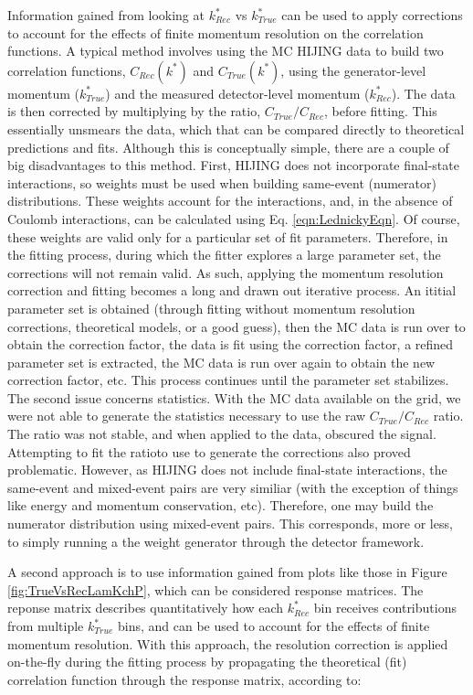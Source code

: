 \documentclass[../AnalysisNoteJBuxton.tex]{subfiles}
\begin{document}
Information gained from looking at $k^{*}_{Rec}$ vs $k^{*}_{True}$ can be used to apply corrections to account for the effects of finite momentum resolution on the correlation functions.
A typical method involves using the MC HIJING data to build two correlation functions, $C_{Rec}(k^{*})$ and $C_{True}(k^{*})$, using the generator-level momentum ($k^{*}_{True}$) and the measured detector-level momentum ($k^{*}_{Rec}$).
The data is then corrected by multiplying by the ratio, $C_{True}/C_{Rec}$, before fitting.
This essentially unsmears the data, which that can be compared directly to theoretical predictions and fits.
Although this is conceptually simple, there are a couple of big disadvantages to this method.
First, HIJING does not incorporate final-state interactions, so weights must be used when building same-event (numerator) distributions.
These weights account for the interactions, and, in the absence of Coulomb interactions, can be calculated using Eq. \ref{eqn:LednickyEqn}.
Of course, these weights are valid only for a particular set of fit parameters.
Therefore, in the fitting process, during which the fitter explores a large parameter set, the corrections will not remain valid.
As such, applying the momentum resolution correction and fitting becomes a long and drawn out iterative process.
An ititial parameter set is obtained (through fitting without momentum resolution corrections, theoretical models, or a good guess), then the MC data is run over to obtain the correction factor, the data is fit using the correction factor, a refined parameter set is extracted, the MC data is run over again to obtain the new correction factor, etc.
This process continues until the parameter set stabilizes.
The second issue concerns statistics.
With the MC data available on the grid, we were not able to generate the statistics necessary to use the raw $C_{True}/C_{Rec}$ ratio.
The ratio was not stable, and when applied to the data, obscured the signal.
Attempting to fit the ratioto use to generate the corrections also proved problematic.
However, as HIJING does not include final-state interactions, the same-event and mixed-event pairs are very similiar (with the exception of things like energy and momentum conservation, etc).
Therefore, one may build the numerator distribution using mixed-event pairs.
This corresponds, more or less, to simply running a the weight generator through the detector framework.

A second approach is to use information gained from plots like those in Figure \ref{fig:TrueVsRecLamKchP}, which can be considered response matrices.
The reponse matrix describes quantitatively how each $k^{*}_{Rec}$ bin receives contributions from multiple $k^{*}_{True}$ bins, and can be used to account for the effects of finite momentum resolution.
With this approach, the resolution correction is applied on-the-fly during the fitting process by propagating the theoretical (fit) correlation function through the response matrix, according to:  
\end{document}
